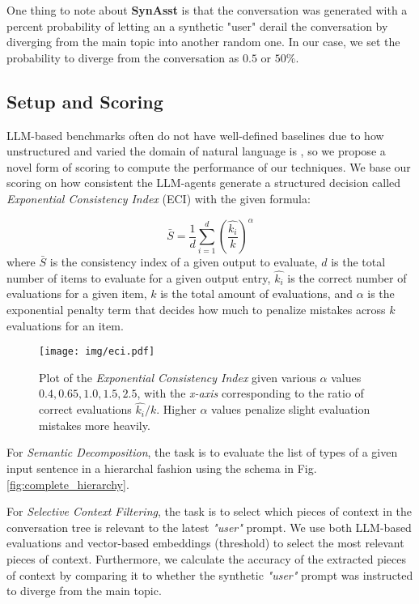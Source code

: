 One thing to note about \textbf{SynAsst} is that the conversation was generated with a percent probability of letting an a synthetic "user" derail the conversation by diverging from the main topic into another random one. In our case, we set the probability to diverge from the conversation as \(0.5\) or \(50\%\).

\subsection{Setup and Scoring}
LLM-based benchmarks often do not have well-defined baselines due to how unstructured and varied the domain of natural language is \cite{liEmbodiedAgentInterface2025}, so we propose a novel form of scoring to compute the performance of our techniques. We base our scoring on how consistent the LLM-agents generate a structured decision called \textit{Exponential Consistency Index} (ECI) with the given formula:

\begin{equation}
    \bar{S} =\frac{1}{d} \sum_{i=1}^{d} \left(\frac{\hat{k_i}}{k}\right)^\alpha
    \label{eq:eci}
\end{equation}
%
where \(\bar{S}\) is the consistency index of a given output to evaluate, \(d\) is the total number of items to evaluate for a given output entry, \(\hat{k_i}\) is the correct number of evaluations for a given item, \(k\) is the total amount of evaluations, and \(\alpha\) is the exponential penalty term that decides how much to penalize mistakes across \(k\) evaluations for an item.

\begin{figure}[h]
\centering
\texttt{[image: img/eci.pdf]}
\caption{Plot of the \textit{Exponential Consistency Index} given various \(\alpha\) values \(0.4, 0.65, 1.0, 1.5, 2.5\), with the \textit{x-axis} corresponding to the ratio of correct evaluations \(\hat{k_i}/{k}\). Higher \(\alpha\) values penalize slight evaluation mistakes more heavily.}
\label{fig:eci}
\end{figure}

For \textit{Semantic Decomposition}, the task is to evaluate the list of types of a given input sentence in a hierarchal fashion using the schema in Fig. \ref{fig:complete_hierarchy}.

For \textit{Selective Context Filtering}, the task is to select which pieces of context in the conversation tree is relevant to the latest \textit{"user"} prompt. We use both LLM-based evaluations and vector-based embeddings (threshold) to select the most relevant pieces of context. Furthermore, we calculate the accuracy of the extracted pieces of context by comparing it to whether the synthetic \textit{"user"} prompt was instructed to diverge from the main topic.

